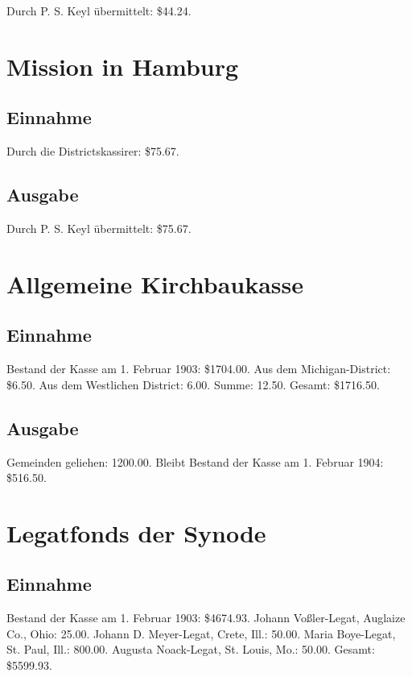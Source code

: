 Durch P. S. Keyl übermittelt: \$44.24.

\section{Mission in Hamburg}

\subsection{Einnahme}

Durch die Districtskassirer: \$75.67.

\subsection{Ausgabe}

Durch P. S. Keyl übermittelt: \$75.67.

\section{Allgemeine Kirchbaukasse}

\subsection{Einnahme}

Bestand der Kasse am 1. Februar 1903: \$1704.00. Aus dem Michigan-District: \$6.50. Aus dem Westlichen District: 6.00. Summe: 12.50. Gesamt: \$1716.50.

\subsection{Ausgabe}

Gemeinden geliehen: 1200.00. Bleibt Bestand der Kasse am 1. Februar 1904: \$516.50.

\section{Legatfonds der Synode}

\subsection{Einnahme}

Bestand der Kasse am 1. Februar 1903: \$4674.93. Johann Voßler-Legat, Auglaize Co., Ohio: 25.00. Johann D. Meyer-Legat, Crete, Ill.: 50.00. Maria Boye-Legat, St. Paul, Ill.: 800.00. Augusta Noack-Legat, St. Louis, Mo.: 50.00. Gesamt: \$5599.93.

